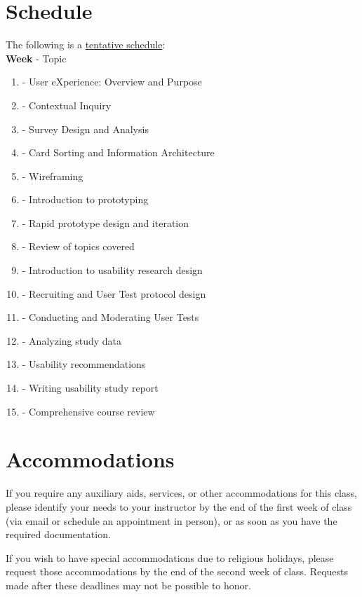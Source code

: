 \documentclass[12pt]{article}
\begin{document}
  \section*{Schedule}
  \noindent
  The following is a \underline{tentative schedule}:\\
  \textbf{Week} - Topic 
  \begin{enumerate}
    \item - User eXperience: Overview and Purpose
    \item - Contextual Inquiry
    \item - Survey Design and Analysis
    \item - Card Sorting and Information Architecture
    \item - Wireframing
    \item - Introduction to prototyping
    \item - Rapid prototype design and iteration
    \item - Review of topics covered
    \item - Introduction to usability research design
    \item - Recruiting and User Test protocol design
    \item - Conducting and Moderating User Tests
    \item - Analyzing study data
    \item - Usability recommendations
    \item - Writing usability study report
    \item - Comprehensive course review
  \end{enumerate}

  \section*{Accommodations}
  \noindent
  If you require any auxiliary aids, services, or other accommodations for this class, please identify your needs to your instructor by the end of the first week of class (via email or schedule an appointment in person), or as soon as you have the required documentation.
  \par
  If you wish to have special accommodations due to religious holidays, please request those accommodations by the end of the second week of class. Requests made after these deadlines may not be possible to honor. 
\end{document}

